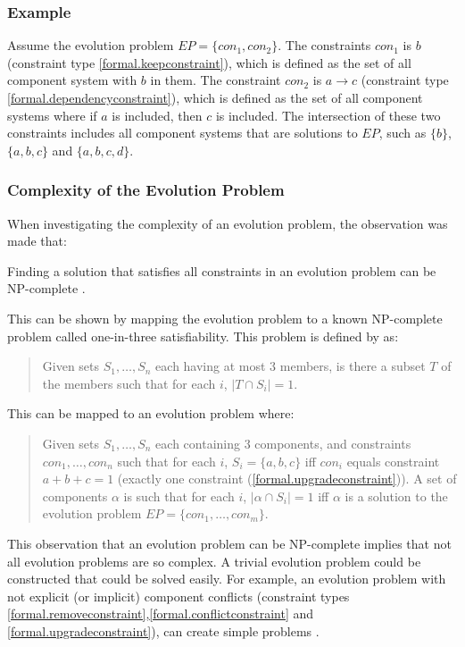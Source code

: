 \subsubsection{Example}
Assume the evolution problem $EP = \{con_1,con_2\}$.
The constraints $con_1$ is $b$ (constraint type \ref{formal.keepconstraint}), which is defined as the set of all component system with $b$ in them.
The constraint $con_2$ is $a \rightarrow c$ (constraint type \ref{formal.dependencyconstraint}), which is defined as the set of all component systems where if $a$ is included, then $c$ is included.
The intersection of these two constraints includes all component systems that are solutions to $EP$, 
such as $\{b\}$, $\{a,b,c\}$ and $\{a,b,c,d\}$.

\subsubsection{Complexity of the Evolution Problem}
When investigating the complexity of an evolution problem, the observation was made that:
\begin{obs}
Finding a solution that satisfies all constraints in an evolution problem can be NP-complete \citep{cook1971}.
\end{obs}
This can be shown by mapping the evolution problem to a known NP-complete problem called one-in-three satisfiability.
This problem is defined by \cite{Schaefer1978} as:
\begin{quote}
Given sets $S_1, \ldots, S_n$ each having at most 3 members, is there a subset $T$ of the members such that for each $i$, $|T \cap S_i|  =  1$.
\end{quote}

This can be mapped to an evolution problem where:
\begin{quote}
Given sets $S_1, \ldots, S_n$ each containing 3 components, and constraints $con_1,\ldots,con_n$
such that for each $i$, $S_i = \{a,b,c\}$ iff $con_i$ equals constraint $a + b + c = 1$ (exactly one constraint (\ref{formal.upgradeconstraint})).
A set of components $\alpha$ is such that for each $i$, $|\alpha \cap S_i|  =  1$ iff $\alpha$ is a solution to the evolution problem $EP = \{con_1,\ldots,con_m\}$.
\end{quote}

This observation that an evolution problem can be NP-complete implies that not all evolution problems are so complex.
A trivial evolution problem could be constructed that could be solved easily.
For example, an evolution problem with not explicit (or implicit) component conflicts 
(constraint types \ref{formal.removeconstraint},\ref{formal.conflictconstraint} and \ref{formal.upgradeconstraint}), can create simple problems \citep{abate2011}.

